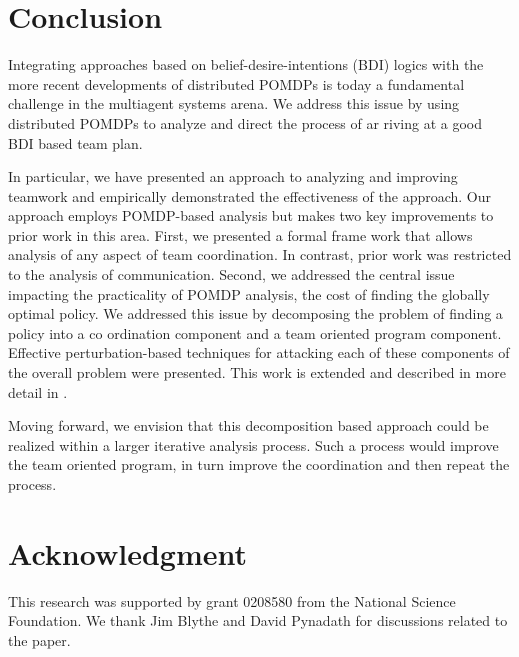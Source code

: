 \documentclass{IEEEtran}
\begin{document}
\section{\textbf{Conclusion}}
 Integrating approaches based on belief-desire-intentions
 (BDI) logics with the more recent developments of distributed POMDPs is today a fundamental challenge in the
 multiagent systems arena. We address this issue by using
 distributed POMDPs to analyze and direct the process of ar
riving at a good BDI based team plan.

In particular, we have presented an approach to analyzing and improving teamwork and empirically demonstrated
 the effectiveness of the approach. Our approach employs
 POMDP-based analysis but makes two key improvements to
 prior work in this area. First, we presented a formal frame
work that allows analysis of any aspect of team coordination. In contrast, prior work was restricted to the analysis
 of communication. Second, we addressed the central issue
 impacting the practicality of POMDP analysis, the cost of
 finding the globally optimal policy. We addressed this issue
 by decomposing the problem of finding a policy into a co
ordination component and a team oriented program component. Effective perturbation-based techniques for attacking
 each of these components of the overall problem were presented. This work is extended and described in more detail
 in \cite{Nair}.

  Moving forward, we envision that this decomposition
 based approach could be realized within a larger iterative
 analysis process. Such a process would improve the team
 oriented program, in turn improve the coordination and then
 repeat the process.

 \section{\textbf{Acknowledgment}}
 This research was supported by grant 0208580 from the
 National Science Foundation. We thank Jim Blythe and
 David Pynadath for discussions related to the paper.
 
  

\end{document}
